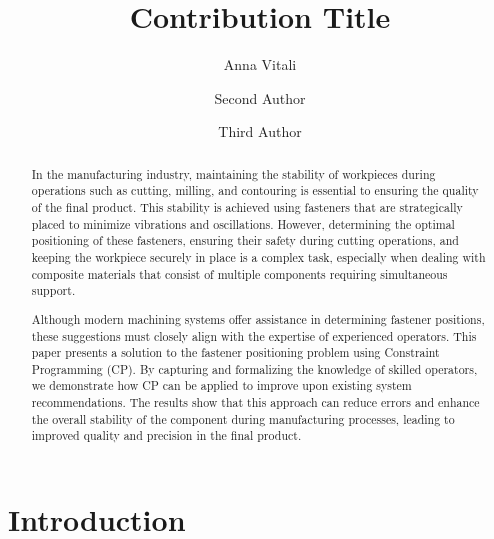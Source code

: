 \documentclass[runningheads]{llncs}
\begin{document}
%
\title{Contribution Title}
%
%
\author{Anna Vitali \and
Second Author \and
Third Author}
%
\authorrunning{}%
%
%
\maketitle              %
%
\begin{abstract}
In the manufacturing industry, maintaining the stability of workpieces during operations such as cutting, milling, and contouring is essential to ensuring the quality of the final product. This stability is achieved using fasteners that are strategically placed to minimize vibrations and oscillations. However, determining the optimal positioning of these fasteners, ensuring their safety during cutting operations, and keeping the workpiece securely in place is a complex task, especially when dealing with composite materials that consist of multiple components requiring simultaneous support.

Although modern machining systems offer assistance in determining fastener positions, these suggestions must closely align with the expertise of experienced operators. This paper presents a solution to the fastener positioning problem using Constraint Programming (CP). By capturing and formalizing the knowledge of skilled operators, we demonstrate how CP can be applied to improve upon existing system recommendations. The results show that this approach can reduce errors and enhance the overall stability of the component during manufacturing processes, leading to improved quality and precision in the final product.

\end{abstract}
%
%
%

\section{Introduction}
\end{document}
